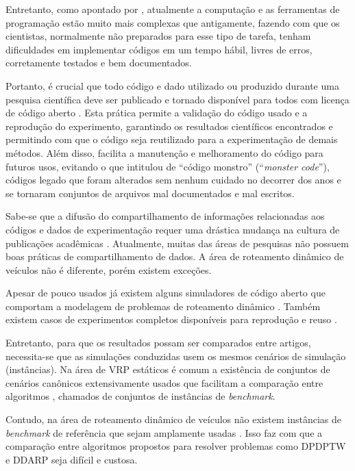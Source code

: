 Entretanto, como apontado por \textcite{merali_computational_2010}, atualmente
a computação e as ferramentas de programação estão muito mais complexas que 
antigamente, fazendo com que os cientistas, normalmente não preparados para 
esse tipo de tarefa, tenham dificuldades em implementar códigos em um tempo 
hábil, livres de erros, corretamente testados e bem documentados.

Portanto, é crucial que todo código e dado utilizado ou produzido durante uma
pesquisa científica deve ser publicado e tornado disponível para todos com
licença de código aberto \cite{ince_case_2012}.
Esta prática permite a validação do código usado e a reprodução do experimento,
garantindo os resultados científicos encontrados e permitindo com que o
código seja reutilizado para a experimentação de demais métodos.
Além disso, facilita a manutenção e melhoramento do código para futuros usos,
evitando o que \textcite{merali_computational_2010} intitulou de ``código
monstro'' (``\textit{monster code}''), códigos legado que foram alterados sem nenhum
cuidado no decorrer dos anos e se tornaram conjuntos de arquivos mal 
documentados e mal escritos.

Sabe-se que a difusão do compartilhamento de informações relacionadas aos
códigos e dados de experimentação requer uma drástica mudança na cultura de 
publicações acadêmicas \cite{leveque_reproducible_2012}.
Atualmente, muitas das áreas de pesquisas não possuem boas práticas de 
compartilhamento de dados. 
A área de roteamento dinâmico de veículos não é diferente, porém existem
exceções.

Apesar de pouco usados já existem alguns simuladores de código aberto que 
comportam a modelagem de problemas de roteamento dinâmico 
\cite{maciejewski_towards_2017, van_lon_rinsim:_2012, mayer_open-source_2016}.
Também existem casos de experimentos completos disponíveis para reprodução e
reuso \cite{van_lon_when_2017, van_lon_towards_2015, van_lon_measures_2016}.

Entretanto, para que os resultados possam ser comparados entre artigos, 
necessita-se que as simulações conduzidas usem os mesmos cenários de 
simulação (instâncias).
Na área de VRP estáticos é comum a existência de conjuntos de cenários
canônicos extensivamente usados que facilitam a comparação entre 
algoritmos \cite{mendoza_vrp-rep:_2014}, chamados de
conjuntos de instâncias de \textit{benchmark}.

Contudo, na área de roteamento dinâmico de veículos não existem 
instâncias de \textit{benchmark} de referência que sejam amplamente usadas 
\cite{pillac_review_2013, maciejewski_towards_2017}. 
Isso faz com que a comparação entre algoritmos
propostos para resolver problemas como DPDPTW e DDARP seja difícil e custosa.

